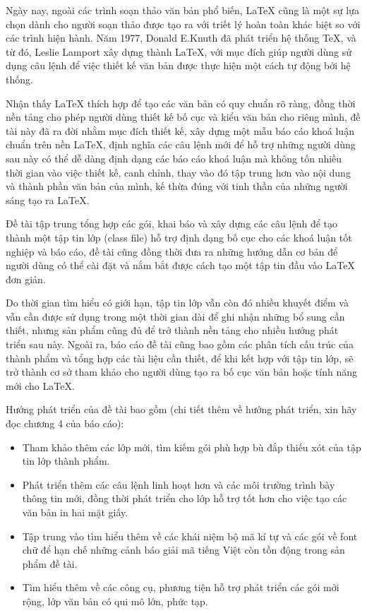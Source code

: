 \documentclass[vietnamese]{vlththesis}
\begin{document}
Ngày nay, ngoài các trình soạn thảo văn bản phổ biến, LaTeX cũng là một sự lựa chọn dành cho người soạn thảo được
tạo ra với triết lý hoàn toàn khác biệt so với các trình hiện hành. Năm 1977, Donald E.Knuth đã phát
triển hệ thống TeX, và từ đó, Leslie Lamport xây dựng thành LaTeX, với mục đích giúp người dùng sử dụng câu
lệnh để việc thiết kế văn bản được thực hiện một cách tự động bởi hệ thống. \par 
Nhận thấy LaTeX thích hợp để tạo các văn bản có quy chuẩn rõ ràng, đồng thời nền tảng cho phép người dùng thiết kế bố cục và kiểu văn bản
cho riêng mình, đề tài này đã ra đời nhằm mục đích thiết kế, xây dựng một mẫu báo cáo khoá luận chuẩn trên nền LaTeX, định nghĩa các câu lệnh
mới để hỗ trợ những người dùng sau này có thể dễ dàng định dạng các báo cáo khoá luận mà không tốn nhiều thời gian vào việc thiết kế, canh chỉnh, thay vào đó
tập trung hơn vào nội dung và thành phần văn bản của mình, kế thừa đúng với tinh thần của những người sáng tạo ra LaTeX.\par
Đề tài tập trung tổng hợp các gói, khai báo và xây dựng các câu lệnh để tạo thành một tập tin lớp (class file)
hỗ trợ định dạng bố cục cho các khoá luận tốt nghiệp và báo cáo, đề tài cũng đồng thời đưa ra những
hướng dẫn cơ bản để người dùng có thể cài đặt và nắm bắt được cách tạo một tập tin đầu vào LaTeX đơn giản.\par
Do thời gian tìm hiểu có giới hạn, tập tin lớp vẫn còn đó nhiều khuyết điểm và vẫn cần được sử
dụng trong một thời gian dài để ghi nhận những bổ sung cần thiết, nhưng sản phẩm 
cũng đủ để trở thành nền tảng cho nhiều hướng phát triển sau này. Ngoài ra, báo cáo đề tài cũng bao gồm
các phân tích cấu trúc của thành phẩm và tổng hợp các tài liệu cần thiết, để khi kết hợp với tập tin lớp, sẽ trở thành cơ sở tham khảo
cho người dùng tạo ra bố cục văn bản hoặc tính năng mới cho LaTeX.\par
Hướng phát triển của đề tài bao gồm (chi tiết thêm về hướng phát triển, xin hãy đọc chương 4 của báo cáo):\par
\begin{itemize}
 \item Tham khảo thêm các lớp mới, tìm kiếm gói phù hợp bù đắp thiếu xót của tập tin lớp thành phẩm.
 \item Phát triển thêm các câu lệnh linh hoạt hơn và các môi trường trình bày thông tin mới, đồng thời 
 phát triển cho lớp hỗ trợ tốt hơn cho việc tạo các văn bản in hai mặt giấy.
 \item Tập trung vào tìm hiểu thêm về các khái niệm bộ mã kí tự và các gói về font chữ để hạn chế những cảnh báo giải mã tiếng Việt còn tồn động trong sản
 phẩm đề tài.
  \item Tìm hiểu thêm về các công cụ, phương tiện hỗ trợ phát triển các gói mởi rộng, lớp văn bản có qui mô lớn, phức tạp.
\end{itemize}
\end{document}
